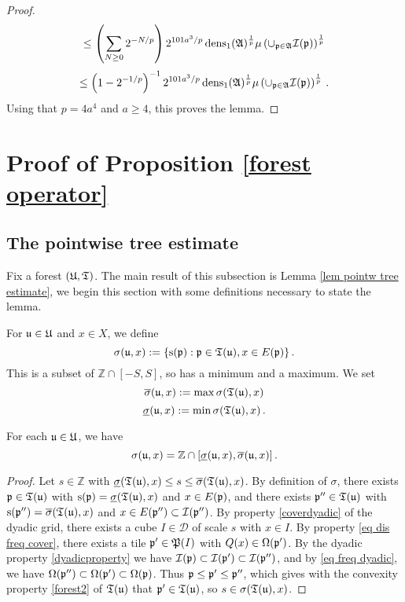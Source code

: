 {\begin{proof}
\begin{equation}
\le \left(\sum_{N\ge 0} 2^{-N/p}\right)2^{101a^3/p}\operatorname{\operatorname{dens}}_1(\mathfrak{A})^{{\frac{1}{p}}}\mu\left(\cup_{\mathfrak p\in\mathfrak{A}}\mathcal{I}(\mathfrak p)\right)^{{\frac{1}{p}}}
\end{equation}
\begin{equation}
\le \left(1-2^{-1/p}\right)^{-1}
2^{101a^3/p}
\operatorname{\operatorname{dens}}_1(\mathfrak{A})^{\frac 1p}\mu\left(\cup_{\mathfrak p\in\mathfrak{A}}\mathcal{I}(\mathfrak p)\right)^{\frac 1p}\, .
\end{equation}
Using that $p = 4a^4$ and $a \ge 4$, this proves the lemma.
\end{proof}







\section{Proof of Proposition \ref{forest operator}}

\label{treesection}

\subsection{The pointwise tree estimate}
Fix a forest $(\mathfrak U, \mathfrak T)$. The main result of this subsection is Lemma \ref{lem pointw tree estimate}, we begin this section with some definitions necessary to state the lemma.

For $\mathfrak u \in \mathfrak U$ and $x\in X$, we define
$$
    \sigma (\mathfrak u, x):=\{\mathrm{s}(\mathfrak p):\mathfrak p\in \mathfrak T(\mathfrak u), x\in E(\mathfrak p)\}\,.
$$
This is a subset of $\mathbb{Z} \cap [-S, S]$, so has a minimum and a maximum. We set
$$
    \overline{\sigma} (\mathfrak u, x) := \max \sigma(\mathfrak T(\mathfrak u), x)
$$
$$
    \underline{\sigma} (\mathfrak u, x) := \min\sigma(\mathfrak T(\mathfrak u), x)\,.
$$
\begin{lemma}
\label{lem sigma convex}
    For each $\mathfrak u \in \mathfrak U$, we have
    $$
        \sigma(\mathfrak u, x) = \mathbb{Z} \cap [\underline{\sigma} (\mathfrak u, x), \overline{\sigma} (\mathfrak u, x)]\,.
    $$
\end{lemma}

\begin{proof}
    Let $s \in \mathbb{Z}$ with $\underline{\sigma} (\mathfrak T(\mathfrak u), x) \le s \le \overline{\sigma} (\mathfrak T(\mathfrak u), x)$. By definition of $\sigma$, there exists $\mathfrak p \in \mathfrak T(\mathfrak u)$ with $\mathrm{s}(\mathfrak p) = \underline{\sigma} (\mathfrak T(\mathfrak u), x)$ and $x \in E(\mathfrak p)$, and there exists $\mathfrak p'' \in \mathfrak T(\mathfrak u)$ with $\mathrm{s}(\mathfrak p'') = \overline{\sigma} (\mathfrak T(\mathfrak u), x)$ and $x \in E(\mathfrak p'') \subset \mathcal{I}(\mathfrak p'')$. By property \eqref{coverdyadic} of the dyadic grid, there exists a cube $I \in \mathcal{D}$ of scale $s$ with $x \in I$. By property \eqref{eq dis freq cover}, there exists a tile $\mathfrak p' \in \mathfrak P(I)$ with ${Q}(x) \in \Omega(\mathfrak p')$. By the dyadic property \eqref{dyadicproperty}  we have $\mathcal{I}(\mathfrak p) \subset \mathcal{I}(\mathfrak p') \subset \mathcal{I}(\mathfrak p'')$, and by \eqref{eq freq dyadic}, we have $\Omega(\mathfrak p'') \subset \Omega(\mathfrak p') \subset \Omega(\mathfrak p)$. Thus $\mathfrak p \le \mathfrak p' \le\mathfrak p''$, which gives with the convexity property \eqref{forest2} of $\mathfrak T(\mathfrak u)$ that $\mathfrak p' \in \mathfrak T(\mathfrak u)$, so $s \in \sigma(\mathfrak T(\mathfrak u), x)$.
\end{proof}

}
